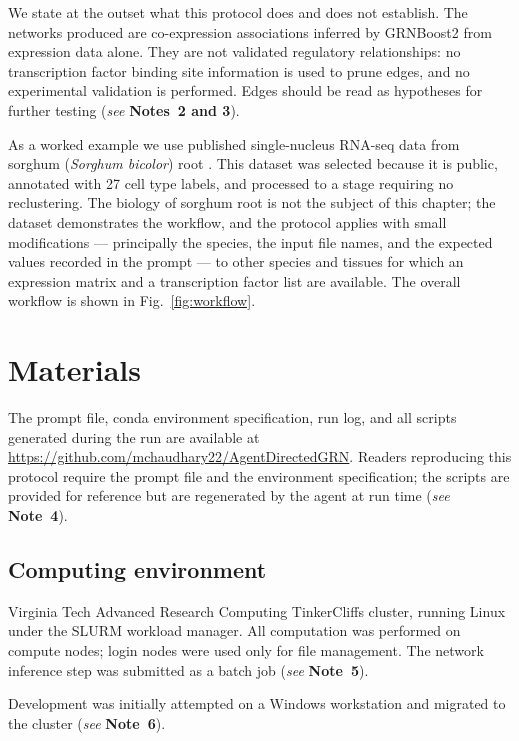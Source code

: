 \documentclass[11pt,a4paper]{article}
\newcommand{\seenote}[1]{(\textit{see} \textbf{Note~#1})}
\newcommand{\seenotes}[1]{(\textit{see} \textbf{Notes~#1})}
\begin{document}
We state at the outset what this protocol does and does not establish. The networks produced are co-expression associations inferred by GRNBoost2 \cite{moerman2019} from expression data alone. They are not validated regulatory relationships: no transcription factor binding site information is used to prune edges, and no experimental validation is performed. Edges should be read as hypotheses for further testing \seenotes{2 and 3}.

As a worked example we use published single-nucleus RNA-seq data from sorghum (\textit{Sorghum bicolor}) root \cite{baumgart2025}. This dataset was selected because it is public, annotated with 27 cell type labels, and processed to a stage requiring no reclustering. The biology of sorghum root is not the subject of this chapter; the dataset demonstrates the workflow, and the protocol applies with small modifications --- principally the species, the input file names, and the expected values recorded in the prompt --- to other species and tissues for which an expression matrix and a transcription factor list are available. The overall workflow is shown in Fig.~\ref{fig:workflow}.

\section{Materials}

The prompt file, conda environment specification, run log, and all scripts generated during the run are available at \url{https://github.com/mchaudhary22/AgentDirectedGRN}. Readers reproducing this protocol require the prompt file and the environment specification; the scripts are provided for reference but are regenerated by the agent at run time \seenote{4}.

\subsection{Computing environment}

Virginia Tech Advanced Research Computing TinkerCliffs cluster, running Linux under the SLURM workload manager. All computation was performed on compute nodes; login nodes were used only for file management. The network inference step was submitted as a batch job \seenote{5}.

Development was initially attempted on a Windows workstation and migrated to the cluster \seenote{6}.
\end{document}
